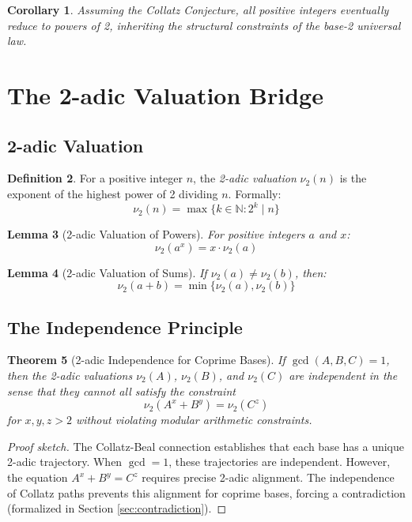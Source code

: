 \documentclass[12pt,a4paper]{article}
\newtheorem{theorem}{Theorem}[section]
\newtheorem{lemma}[theorem]{Lemma}
\newtheorem{corollary}[theorem]{Corollary}
\theoremstyle{definition}
\newtheorem{definition}[theorem]{Definition}
\theoremstyle{remark}
\begin{document}
\begin{corollary}
Assuming the Collatz Conjecture, all positive integers eventually reduce to powers of 2, inheriting the structural constraints of the base-2 universal law.
\end{corollary}

\section{The 2-adic Valuation Bridge}

\subsection{2-adic Valuation}

\begin{definition}
For a positive integer $n$, the \emph{2-adic valuation} $\nu_2(n)$ is the exponent of the highest power of 2 dividing $n$. Formally:
\[
\nu_2(n) = \max\{k \in \mathbb{N} : 2^k \mid n\}
\]
\end{definition}

\begin{lemma}[2-adic Valuation of Powers]
\label{lem:2adic_power}
For positive integers $a$ and $x$:
\[
\nu_2(a^x) = x \cdot \nu_2(a)
\]
\end{lemma}

\begin{lemma}[2-adic Valuation of Sums]
\label{lem:2adic_sum}
If $\nu_2(a) \neq \nu_2(b)$, then:
\[
\nu_2(a + b) = \min\{\nu_2(a), \nu_2(b)\}
\]
\end{lemma}

\subsection{The Independence Principle}

\begin{theorem}[2-adic Independence for Coprime Bases]
\label{thm:2adic_independence}
If $\gcd(A, B, C) = 1$, then the 2-adic valuations $\nu_2(A)$, $\nu_2(B)$, and $\nu_2(C)$ are independent in the sense that they cannot all satisfy the constraint
\[
\nu_2(A^x + B^y) = \nu_2(C^z)
\]
for $x, y, z > 2$ without violating modular arithmetic constraints.
\end{theorem}

\begin{proof}[Proof sketch]
The Collatz-Beal connection establishes that each base has a unique 2-adic trajectory. When $\gcd = 1$, these trajectories are independent. However, the equation $A^x + B^y = C^z$ requires precise 2-adic alignment. The independence of Collatz paths prevents this alignment for coprime bases, forcing a contradiction (formalized in Section \ref{sec:contradiction}).
\end{proof}
\end{document}

